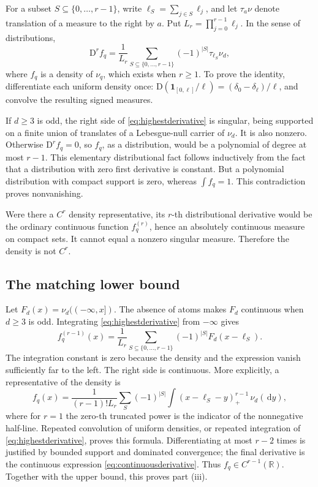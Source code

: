\documentclass[11pt,letterpaper]{article}
\numberwithin{equation}{section}
\theoremstyle{definition}
\theoremstyle{remark}
\newcommand{\R}{\mathbb R}
\newcommand{\dd}{\,\mathrm d}
\newcommand{\D}{\mathrm D}
\begin{document}
For a subset \(S\subseteq\{0,\ldots,r-1\}\), write
\(\ell_S=\sum_{j\in S}\ell_j\), and let \(\tau_a\nu\) denote translation of a measure to the right by \(a\). Put \(L_r=\prod_{j=0}^{r-1}\ell_j\). In the sense of distributions,
\begin{equation}
 \D^r f_q=
 \frac1{L_r}\sum_{S\subseteq\{0,\ldots,r-1\}}(-1)^{|S|}\tau_{\ell_S}\nu_d,
 \label{eq:highestderivative}
\end{equation}
where \(f_q\) is a density of \(\nu_q\), which exists when \(r\geq1\). To prove the identity, differentiate each uniform density once:
\(\D(\mathbf1_{[0,\ell]}/\ell)=(\delta_0-\delta_\ell)/\ell\), and convolve the resulting signed measures.

If \(d\geq3\) is odd, the right side of \eqref{eq:highestderivative} is singular, being supported on a finite union of translates of a Lebesgue-null carrier of \(\nu_d\). It is also nonzero. Otherwise \(\D^rf_q=0\), so \(f_q\), as a distribution, would be a polynomial of degree at most \(r-1\). This elementary distributional fact follows inductively from the fact that a distribution with zero first derivative is constant. But a polynomial distribution with compact support is zero, whereas \(\int f_q=1\). This contradiction proves nonvanishing.

Were there a \(C^r\) density representative, its \(r\)-th distributional derivative would be the ordinary continuous function \(f_q^{(r)}\), hence an absolutely continuous measure on compact sets. It cannot equal a nonzero singular measure. Therefore the density is not \(C^r\).

\subsection{The matching lower bound}
Let \(F_d(x)=\nu_d(( -\infty,x])\). The absence of atoms makes \(F_d\) continuous when \(d\geq3\) is odd. Integrating \eqref{eq:highestderivative} from \(-\infty\) gives
\begin{equation}
 f_q^{(r-1)}(x)=\frac1{L_r}
       \sum_{S\subseteq\{0,\ldots,r-1\}}(-1)^{|S|}F_d(x-\ell_S).
 \label{eq:continuousderivative}
\end{equation}
The integration constant is zero because the density and the expression vanish sufficiently far to the left. The right side is continuous. More explicitly, a representative of the density is
\begin{equation}
 f_q(x)=\frac1{(r-1)!L_r}\sum_S(-1)^{|S|}
                 \int (x-\ell_S-y)_+^{r-1}\,\nu_d(\dd y),
 \label{eq:truncatedpowers}
\end{equation}
where for \(r=1\) the zero-th truncated power is the indicator of the nonnegative half-line. Repeated convolution of uniform densities, or repeated integration of \eqref{eq:highestderivative}, proves this formula. Differentiating at most \(r-2\) times is justified by bounded support and dominated convergence; the final derivative is the continuous expression \eqref{eq:continuousderivative}. Thus \(f_q\in C^{r-1}(\R)\). Together with the upper bound, this proves part (iii).
\end{document}
